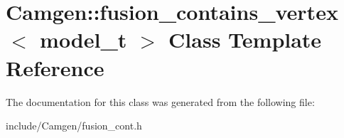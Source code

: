 \hypertarget{a00240}{}\section{Camgen\+:\+:fusion\+\_\+contains\+\_\+vertex$<$ model\+\_\+t $>$ Class Template Reference}
\label{a00240}


The documentation for this class was generated from the following file\+:\begin{DoxyCompactItemize}
\item 
include/\+Camgen/fusion\+\_\+cont.\+h\end{DoxyCompactItemize}
